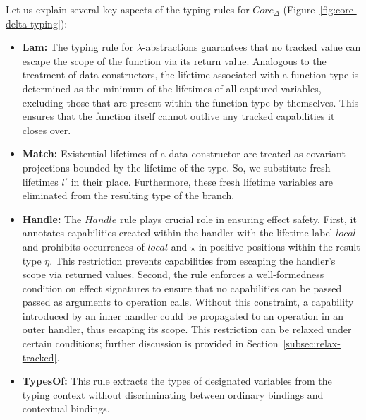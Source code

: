 \documentclass[11pt]{article}
\begin{document}
    Let us explain several key aspects of the typing rules for $Core_\Delta$ (Figure\ \ref{fig:core-delta-typing}):
    \begin{itemize}
        \item \textbf{Lam:} The typing rule for $\lambda$-abstractions guarantees that no tracked value can escape the scope of the function via its return value.
        Analogous to the treatment of data constructors, the lifetime associated with a function type is determined as the minimum of the lifetimes of all captured variables, excluding those that are present within the function type by themselves.
        This ensures that the function itself cannot outlive any tracked capabilities it closes over.
        \item \textbf{Match:}
        Existential lifetimes of a data constructor are treated as covariant projections bounded by the lifetime of the type. %
        So, we substitute fresh lifetimes $l'$ in their place.
        Furthermore, these fresh lifetime variables are eliminated from the resulting type of the branch.
        \item \textbf{Handle:} The $Handle$ rule plays crucial role in ensuring effect safety.
        First, it annotates capabilities created within the handler with the lifetime label $local$ and prohibits occurrences of $local$ and $\star$ in positive positions within the result type $\eta$.
        This restriction prevents capabilities from escaping the handler’s scope via returned values.
        Second, the rule enforces a well-formedness condition on effect signatures to ensure that no capabilities can be passed passed as arguments to operation calls.
        Without this constraint, a capability introduced by an inner handler could be propagated to an operation in an outer handler, thus escaping its scope.
        This restriction can be relaxed under certain conditions; further discussion is provided in Section~\ref{subsec:relax-tracked}.
        \item \textbf{TypesOf:} This rule extracts the types of designated variables from the typing context without discriminating between ordinary bindings and contextual bindings.
    \end{itemize}
\end{document}
